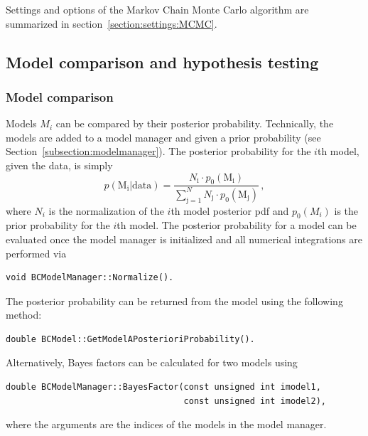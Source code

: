 \documentclass[11pt, a4paper]{article}
\begin{document}
Settings and options of the Markov Chain Monte Carlo algorithm are
summarized in section~\ref{section:settings:MCMC}.


\subsection{Model comparison and hypothesis testing}


\subsubsection{Model comparison}

Models $M_{i}$ can be compared by their posterior
probability. Technically, the models are added to a model manager and
given a prior probability (see
Section~\ref{subsection:modelmanager}). The posterior probability for
the $i$th model, given the data, is simply
%
\begin{equation}
p(\mathrm{M_{i}}|\mathrm{data}) = \frac{N_{\mathrm{i}} \cdot p_{0}(\mathrm{M_{i}})}{\sum_{\mathrm{j} = 1}^{N} N_{\mathrm{j}} \cdot p_{0}(\mathrm{M_{j}})} \, ,
\end{equation}
%
where $N_{i}$ is the normalization of the $i$th model posterior pdf
and $p_{0}(M_{i})$ is the prior probability for the $i$th model. The
posterior probability for a model can be evaluated once the model
manager is initialized and all numerical integrations are performed
via
%
\begin{verbatim}
void BCModelManager::Normalize().
\end{verbatim}
%
The posterior probability can be returned from the model using the
following method:
%
\begin{verbatim}
double BCModel::GetModelAPosterioriProbability().
\end{verbatim}

Alternatively, Bayes factors can be calculated for two models using
%
\begin{verbatim}
double BCModelManager::BayesFactor(const unsigned int imodel1,
                                   const unsigned int imodel2),
\end{verbatim}
%
where the arguments are the indices of the models in the model
manager.
\end{document}
